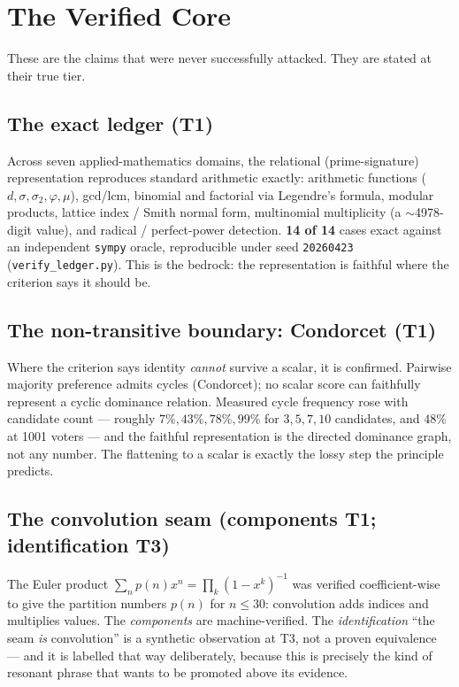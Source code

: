 \documentclass[11pt,a4paper]{article}
\newcommand{\seed}{\texttt{20260423}}
\newcommand{\TT}{\textsf{T1}}
\newcommand{\Th}{\textsf{T3}}
\theoremstyle{definition}
\theoremstyle{plain}
\begin{document}
\section{The Verified Core}\label{sec:core}

These are the claims that were never successfully attacked. They are stated at their true tier.

\subsection{The exact ledger (\TT)}
Across seven applied-mathematics domains, the relational (prime-signature) representation
reproduces standard arithmetic exactly: arithmetic functions ($d,\sigma,\sigma_2,\varphi,\mu$),
gcd/lcm, binomial and factorial via Legendre's formula, modular products, lattice index / Smith
normal form, multinomial multiplicity (a $\sim$4978-digit value), and radical / perfect-power
detection. \textbf{14 of 14} cases exact against an independent \texttt{sympy} oracle,
reproducible under seed \seed{} (\texttt{verify\_ledger.py}). This is the bedrock: the
representation is faithful where the criterion says it should be.

\subsection{The non-transitive boundary: Condorcet (\TT)}
Where the criterion says identity \emph{cannot} survive a scalar, it is confirmed. Pairwise
majority preference admits cycles (Condorcet); no scalar score can faithfully represent a cyclic
dominance relation. Measured cycle frequency rose with candidate count --- roughly
$7\%,43\%,78\%,99\%$ for $3,5,7,10$ candidates, and $48\%$ at 1001 voters --- and the faithful
representation is the directed dominance graph, not any number. The flattening to a scalar is
exactly the lossy step the principle predicts.

\subsection{The convolution seam (components \TT; identification \Th)}
The Euler product $\sum_n p(n)x^n = \prod_k (1-x^k)^{-1}$ was verified coefficient-wise to give
the partition numbers $p(n)$ for $n\le 30$: convolution adds indices and multiplies values. The
\emph{components} are machine-verified. The \emph{identification} ``the seam \emph{is}
convolution'' is a synthetic observation at \Th, not a proven equivalence --- and it is labelled
that way deliberately, because this is precisely the kind of resonant phrase that wants to be
promoted above its evidence.
\end{document}
